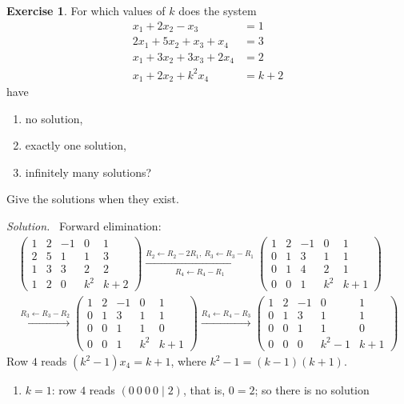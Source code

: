 \documentclass[12pt]{article}
\theoremstyle{definition}
\newtheorem{exercise}{Exercise}
\newenvironment{solution}{\par\noindent\textit{Solution.}\ }{\par\smallskip}
\begin{document}
\begin{exercise}\label{r2-dr-parameter}
For which values of \(k\) does the system
\[
\begin{aligned}
x_1+2x_2-x_3&=1\\
2x_1+5x_2+x_3+x_4&=3\\
x_1+3x_2+3x_3+2x_4&=2\\
x_1+2x_2+k^2x_4&=k+2
\end{aligned}
\]
have
\begin{enumerate}
\item no solution,
\item exactly one solution,
\item infinitely many solutions?
\end{enumerate}
Give the solutions when they exist.
\end{exercise}
\begin{solution}
Forward elimination:
\[
\begin{gathered}
\left(\begin{array}{cccc|c}1&2&-1&0&1\\2&5&1&1&3\\1&3&3&2&2\\1&2&0&k^2&k+2\end{array}\right)
\xrightarrow[R_4\leftarrow R_4-R_1]{R_2\leftarrow R_2-2R_1,\ R_3\leftarrow R_3-R_1}
\left(\begin{array}{cccc|c}1&2&-1&0&1\\0&1&3&1&1\\0&1&4&2&1\\0&0&1&k^2&k+1\end{array}\right)
\\
\xrightarrow{R_3\leftarrow R_3-R_2}
\left(\begin{array}{cccc|c}1&2&-1&0&1\\0&1&3&1&1\\0&0&1&1&0\\0&0&1&k^2&k+1\end{array}\right)
\xrightarrow{R_4\leftarrow R_4-R_3}
\left(\begin{array}{cccc|c}1&2&-1&0&1\\0&1&3&1&1\\0&0&1&1&0\\0&0&0&k^2-1&k+1\end{array}\right)
\end{gathered}
\]
Row \(4\) reads \((k^2-1)x_4=k+1\), where \(k^2-1=(k-1)(k+1)\).
\begin{enumerate}
\item \(k=1\): row \(4\) reads \((0\ 0\ 0\ 0\mid2)\), that is, \(0=2\); so there is no solution

\end{enumerate}
\end{solution}
\end{document}
